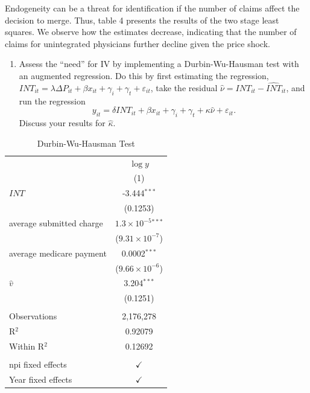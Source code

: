 \documentclass[
  12pt,
]{article}
\providecommand{\tightlist}{%
  \setlength{\itemsep}{0pt}\setlength{\parskip}{0pt}}
\begin{document}
Endogeneity can be a threat for identification if the number of claims
affect the decision to merge. Thus, table 4 presents the results of the
two stage least squares. We observe how the estimates decrease,
indicating that the number of claims for unintegrated physicians further
decline given the price shock.

\begin{enumerate}
\def\labelenumi{\arabic{enumi}.}
\setcounter{enumi}{5}
\tightlist
\item
  Assess the ``need'' for IV by implementing a Durbin-Wu-Hausman test
  with an augmented regression. Do this by first estimating the
  regression,
  \(INT_{it} = \lambda \Delta P_{it} + \beta x_{it} + \gamma_{i} + \gamma_{t} + \varepsilon_{it}\),
  take the residual \(\hat{\nu} = INT_{it} - \hat{INT}_{it}\), and run
  the regression
  \[y_{it} = \delta INT_{it} + \beta x_{it} + \gamma_{i} + \gamma_{t} + \kappa \hat{\nu} + \varepsilon_{it}.\]
  Discuss your results for \(\hat{\kappa}\).
\end{enumerate}

\begin{table}[ht]
\centering
\begin{tabular}{lc}
   \toprule
                                      & $\log y$\\   
                                      & (1)\\  
   \midrule 
   $INT$                                & -3.444$^{***}$\\   
                                      & (0.1253)\\   
   average submitted charge      & $1.3\times 10^{-5}$$^{***}$\\    
                                      & ($9.31\times 10^{-7}$)\\    
   average medicare payment    & 0.0002$^{***}$\\   
                                      & ($9.66\times 10^{-6}$)\\    
   $\hat{v}$                             & 3.204$^{***}$\\   
                                      & (0.1251)\\   
    \\
   Observations                       & 2,176,278\\  
   R$^2$                              & 0.92079\\  
   Within R$^2$                       & 0.12692\\  
    \\
   npi fixed effects                  & $\checkmark$\\   
   Year fixed effects                 & $\checkmark$\\   
   \bottomrule
\end{tabular}
\caption{Durbin-Wu-Hausman Test }
\end{table}
\end{document}
